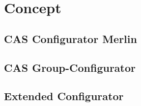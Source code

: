 \chapter{Concept}
\label{ch:Concept}

\section{CAS Configurator Merlin}
\label{sec:Concept:ConfiguratorMerlin}


\section{CAS Group-Configurator}
\label{sec:Concept:GroupConfigurator}

\section{Extended Configurator}
\label{sec:Concept:ExtendedConfigurator}

